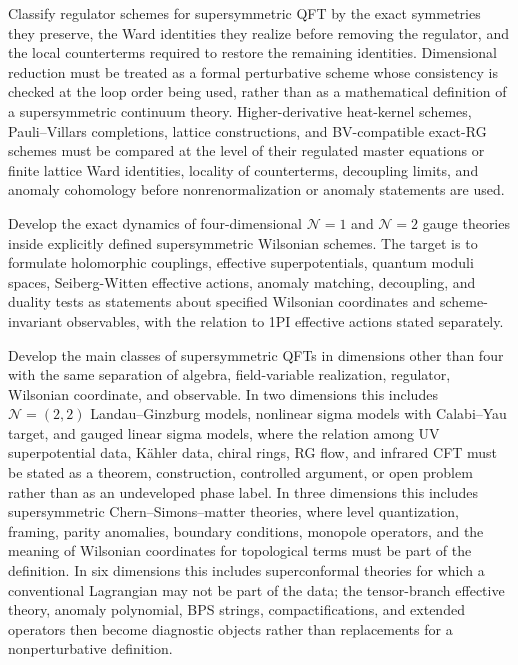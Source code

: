 \begin{openproblem}
\label{op:susy-regulators-preserving-supersymmetry}
Classify regulator schemes for supersymmetric QFT by the exact symmetries
they preserve, the Ward identities they realize before removing the
regulator, and the local counterterms required to restore the remaining
identities.  Dimensional reduction must be treated as a formal perturbative
scheme whose consistency is checked at the loop order being used, rather than
as a mathematical definition of a supersymmetric continuum theory.
Higher-derivative heat-kernel schemes, Pauli--Villars completions, lattice
constructions, and BV-compatible exact-RG schemes must be compared at the
level of their regulated master equations or finite lattice Ward identities,
locality of counterterms, decoupling limits, and anomaly cohomology before
nonrenormalization or anomaly statements are used.
\end{openproblem}

\begin{openproblem}
\label{op:susy-wilsonian-foundations-gauge-dynamics}
Develop the exact dynamics of four-dimensional \(\mathcal N=1\) and
\(\mathcal N=2\) gauge theories inside explicitly defined supersymmetric
Wilsonian schemes.  The target is to formulate holomorphic couplings,
effective superpotentials, quantum moduli spaces, Seiberg-Witten effective
actions, anomaly matching, decoupling, and duality tests as statements about
specified Wilsonian coordinates and scheme-invariant observables, with the
relation to 1PI effective actions stated separately.
\end{openproblem}

\begin{openproblem}
\label{op:susy-examples-across-dimensions}
Develop the main classes of supersymmetric QFTs in dimensions other than four
with the same separation of algebra, field-variable realization, regulator,
Wilsonian coordinate, and observable.  In two dimensions this includes
\(\mathcal N=(2,2)\) Landau--Ginzburg models, nonlinear sigma models with
Calabi--Yau target, and gauged linear sigma models, where the relation among
UV superpotential data, Kähler data, chiral rings, RG flow, and infrared CFT
must be stated as a theorem, construction, controlled argument, or open
problem rather than as an undeveloped phase label.  In three dimensions this includes
supersymmetric Chern--Simons--matter theories, where level quantization,
framing, parity anomalies, boundary conditions, monopole operators, and the
meaning of Wilsonian coordinates for topological terms must be part of the
definition.  In six dimensions this includes superconformal theories for
which a conventional Lagrangian may not be part of the data; the tensor-branch
effective theory, anomaly polynomial, BPS strings, compactifications, and
extended operators then become diagnostic objects rather than replacements
for a nonperturbative definition.
\end{openproblem}

